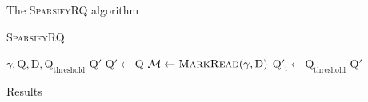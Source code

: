 \documentclass[12pt]{beamer}
\begin{document}
    \begin{frame}{The \textsc{SparsifyRQ} algorithm}
        \begin{algorithm}[H]
	    \caption{\textsc{SparsifyRQ}}
	    \begin{algorithmic}[1]
                \REQUIRE \(\gamma,\text{Q},\text{D},\text{Q}_{\text{threshold}}\)
		\ENSURE \(\text{Q}'\)
		\STATE \(\text{Q}' \leftarrow \text{Q}\)
		\STATE \(\mathcal{M} \leftarrow \text{\textsc{MarkRead}}(\gamma, \text{D})\)
		        \STATE \(\text{Q}'_\text{i} \leftarrow \text{Q}_{\text{threshold}}\)
		    \ENDIF
		\ENDFOR
		\RETURN \(\text{Q}'\)
	    \end{algorithmic}
	\end{algorithm}
    \end{frame}

    \begin{frame}{Results}
    \end{frame}
\end{document}
